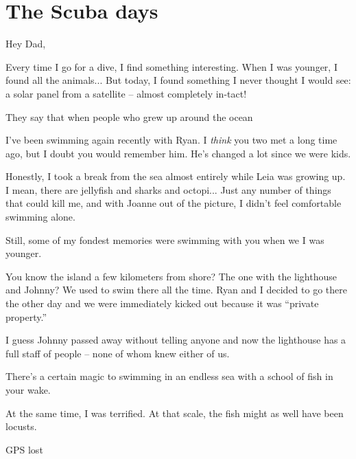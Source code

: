 \section*{The Scuba days}

Hey Dad,

Every time I go for a dive, I find something interesting.
When I was younger, I found all the animals...
But today, I found something I never thought I would see: a solar panel from a satellite -- almost completely in-tact!

They say that when people who grew up around the ocean 

I've been swimming again recently with Ryan.
I \textit{think} you two met a long time ago, but I doubt you would remember him.
He's changed a lot since we were kids.

Honestly, I took a break from the sea almost entirely while Leia was growing up.
I mean, there are jellyfish and sharks and octopi... Just any number of things that could kill me, and with Joanne out of the picture, I didn't feel comfortable swimming alone.

Still, some of my fondest memories were swimming with you when we I was younger.

You know the island a few kilometers from shore?
The one with the lighthouse and Johnny?
We used to swim there all the time.
Ryan and I decided to go there the other day and we were immediately kicked out because it was ``private property.''

I guess Johnny passed away without telling anyone and now the lighthouse has a full staff of people -- none of whom knew either of us.

There's a certain magic to swimming in an endless sea with a school of fish in your wake.

At the same time, I was terrified.
At that scale, the fish might as well have been locusts.

GPS lost
